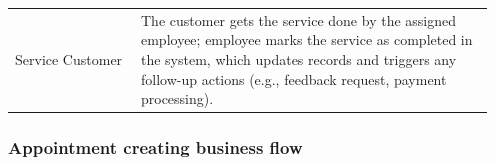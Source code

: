 \documentclass[]{VUMIFTemplateClass}
\begin{document}
\begin{longtable}{p{0.25\linewidth} p{0.70\linewidth}}


Service Customer &
\begin{minipage}[t]{\linewidth}
    The customer gets the service done by the assigned employee; employee marks the service as completed in the system, which updates records and triggers any follow-up actions (e.g., feedback request, payment processing).
\end{minipage} \\
\end{longtable}

\vspace{1cm}


\subsubsection{Appointment creating business flow}
\end{document}
